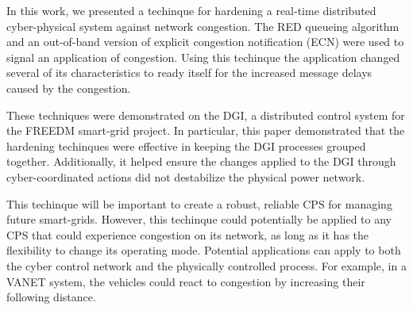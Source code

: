 
In this work, we presented a techinque for hardening a real-time distributed cyber-physical system against network congestion.
The RED queueing algorithm and an out-of-band version of explicit congestion notification (ECN) were used to signal an application of congestion.
Using this techinque the application changed several of its characteristics to ready itself for the increased message delays caused by the congestion.

These techniques were demonstrated on the DGI, a distributed control system for the FREEDM smart-grid project.
In particular, this paper demonstrated that the hardening techinques were effective in keeping the DGI processes grouped together.
Additionally, it helped ensure the changes applied to the DGI through cyber-coordinated actions did not destabilize the physical power network.

This techinque will be important to create a robust, reliable CPS for managing future smart-grids.
However, this techinque could potentially be applied to any CPS that could experience congestion on its network, as long as it has the flexibility to change its operating mode.
Potential applications can apply to both the cyber control network and the physically controlled process.
For example, in a VANET system, the vehicles could react to congestion by increasing their following distance.
